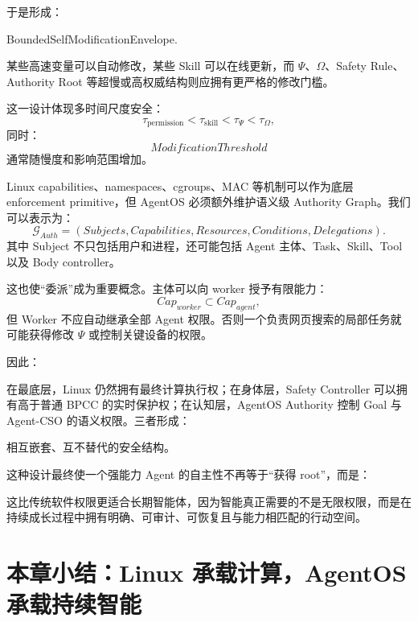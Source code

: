 于是形成：
\begin{statementbox}
BoundedSelfModificationEnvelope.
\end{statementbox}
某些高速变量可以自动修改，某些 Skill 可以在线更新，而 $\Psi$、$\Omega$、Safety Rule、Authority Root 等超慢或高权威结构则应拥有更严格的修改门槛。

这一设计体现多时间尺度安全：
\[
\tau_{\mathrm{permission}}
<
\tau_{\mathrm{skill}}
<
\tau_{\Psi}
<
\tau_{\Omega},
\]
同时：
\[
ModificationThreshold
\]
通常随慢度和影响范围增加。

Linux capabilities、namespaces、cgroups、MAC 等机制可以作为底层 enforcement primitive，但 AgentOS 必须额外维护语义级 Authority Graph。我们可以表示为：
\[
\mathcal G_{Auth}
=
(
Subjects,
Capabilities,
Resources,
Conditions,
Delegations
).
\]
其中 Subject 不只包括用户和进程，还可能包括 Agent 主体、Task、Skill、Tool 以及 Body controller。

这也使“委派”成为重要概念。主体可以向 worker 授予有限能力：
\[
Cap_{worker}
\subset
Cap_{agent},
\]
但 Worker 不应自动继承全部 Agent 权限。否则一个负责网页搜索的局部任务就可能获得修改 $\Psi$ 或控制关键设备的权限。

因此：
\begin{statementbox}
\centering
{}
\end{statementbox}

在最底层，Linux 仍然拥有最终计算执行权；在身体层，Safety Controller 可以拥有高于普通 BPCC 的实时保护权；在认知层，AgentOS Authority 控制 Goal 与 Agent-CSO 的语义权限。三者形成：
\begin{statementbox}
\centering
{}
\end{statementbox}
相互嵌套、互不替代的安全结构。

这种设计最终使一个强能力 Agent 的自主性不再等于“获得 root”，而是：
\begin{statementbox}
\centering
{}
\end{statementbox}
这比传统软件权限更适合长期智能体，因为智能真正需要的不是无限权限，而是在持续成长过程中拥有明确、可审计、可恢复且与能力相匹配的行动空间。

\section{本章小结：Linux 承载计算，AgentOS 承载持续智能}

